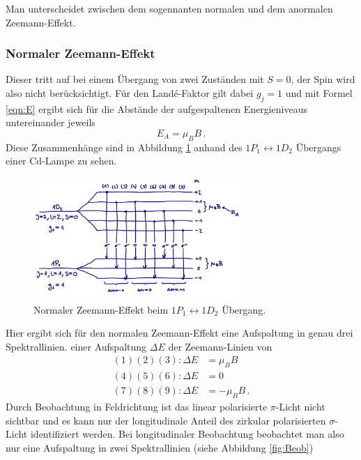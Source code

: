         Man unterscheidet zwischen dem sogennanten normalen und dem anormalen Zeemann-Effekt.
        \subsubsection{Normaler Zeemann-Effekt}
            Dieser tritt auf bei einem Übergang von zwei Zuständen mit $S=0$, der Spin wird also nicht berücksichtigt.
            Für den Landé-Faktor gilt dabei $g_j=1$ und mit Formel \ref{eqn:E}
            ergibt sich für die Abstände der aufgespaltenen Energieniveaus untereinander jeweils
            \begin{equation}
                E_A= \mu_BB \, .
            \end{equation}
            Diese Zusammenhänge sind in Abbildung \ref{fig:NZ} anhand des $1P_1\leftrightarrow 1D_2$ Übergangs einer Cd-Lampe zu sehen.
            \begin{figure}[h]
                \centering
                \includegraphics[width = 0.7\textwidth]{pictures/normal.png}
                \caption{Normaler Zeemann-Effekt beim $1P_1\leftrightarrow 1D_2$ Übergang.}
                \label{fig:NZ}
            \end{figure}
            Hier ergibt sich für den normalen Zeemann-Effekt eine Aufspaltung in genau drei Spektrallinien.
            einer Aufspaltung $\Delta E$ der Zeemann-Linien von
            \begin{align}
                (1)(2)(3): \Delta E&=\mu_BB \\
                (4)(5)(6): \Delta E&=0 \\
                (7)(8)(9): \Delta E&=-\mu_BB \, .
            \end{align}
            Durch Beobachtung in Feldrichtung ist das linear polarisierte $\pi$-Licht nicht sichtbar und es
            kann nur der longitudinale Anteil des zirkular polarisierten $\sigma$-Licht identifiziert werden.
            Bei longitudinaler Beobachtung beobachtet man also nur eine Aufspaltung in zwei Spektrallinien (siehe Abbildung \ref{fig:Beob})
